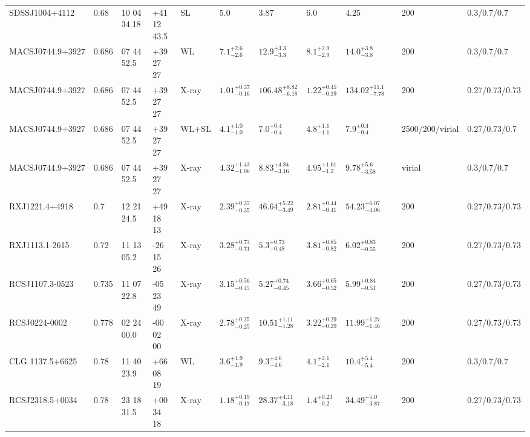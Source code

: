 \begin{landscape}
\begin{center}
{\begin{longtable}{llllllllllll}
SDSSJ1004+4112 & 0.68 & 10 04 34.18 & +41 12 43.5 & SL & ${5.0}^{}_{}$ & ${3.87}^{}_{}$ & ${6.0}^{}_{}$ & ${4.25}^{}_{}$ & \citet{WI04.1} & 200 & 0.3/0.7/0.7 \\
MACSJ0744.9+3927 & 0.686 & 07 44 52.5 & +39 27 27 & WL & ${7.1}^{+2.6}_{-2.6}$ & ${12.9}^{+3.3}_{-3.3}$ & ${8.1}^{+2.9}_{-2.9}$ & ${14.0}^{+3.8}_{-3.8}$ & \citet{SE14.1} & 200 & 0.3/0.7/0.7 \\
MACSJ0744.9+3927 & 0.686 & 07 44 52.5 & +39 27 27 & X-ray & ${1.01}^{+0.37}_{-0.16}$ & ${106.48}^{+8.82}_{-6.18}$ & ${1.22}^{+0.45}_{-0.19}$ & ${134.02}^{+11.1}_{-7.78}$ & \citet{BA14.1} & 200 & 0.27/0.73/0.73 \\
MACSJ0744.9+3927 & 0.686 & 07 44 52.5 & +39 27 27 & WL+SL & ${4.1}^{+1.0}_{-1.0}$ & ${7.0}^{+0.4}_{-0.4}$ & ${4.8}^{+1.1}_{-1.1}$ & ${7.9}^{+0.4}_{-0.4}$ & \citet{ME14.1} & 2500/200/virial & 0.27/0.73/0.7 \\
MACSJ0744.9+3927 & 0.686 & 07 44 52.5 & +39 27 27 & X-ray & ${4.32}^{+1.43}_{-1.06}$ & ${8.83}^{+4.84}_{-3.16}$ & ${4.95}^{+1.61}_{-1.2}$ & ${9.78}^{+5.6}_{-3.58}$ & \citet{SC07.1} & virial & 0.3/0.7/0.7 \\
RXJ1221.4+4918 & 0.7 & 12 21 24.5 & +49 18 13 & X-ray & ${2.39}^{+0.37}_{-0.35}$ & ${46.64}^{+5.22}_{-3.49}$ & ${2.81}^{+0.44}_{-0.41}$ & ${54.23}^{+6.07}_{-4.06}$ & \citet{BA14.1} & 200 & 0.27/0.73/0.73 \\
RXJ1113.1-2615 & 0.72 & 11 13 05.2 & -26 15 26 & X-ray & ${3.28}^{+0.73}_{-0.71}$ & ${5.3}^{+0.73}_{-0.48}$ & ${3.81}^{+0.85}_{-0.82}$ & ${6.02}^{+0.83}_{-0.55}$ & \citet{BA14.1} & 200 & 0.27/0.73/0.73 \\
RCSJ1107.3-0523 & 0.735 & 11 07 22.8 & -05 23 49 & X-ray & ${3.15}^{+0.56}_{-0.45}$ & ${5.27}^{+0.74}_{-0.45}$ & ${3.66}^{+0.65}_{-0.52}$ & ${5.99}^{+0.84}_{-0.51}$ & \citet{BA14.1} & 200 & 0.27/0.73/0.73 \\
RCSJ0224-0002 & 0.778 & 02 24 00.0 & -00 02 00 & X-ray & ${2.78}^{+0.25}_{-0.25}$ & ${10.51}^{+1.11}_{-1.28}$ & ${3.22}^{+0.29}_{-0.29}$ & ${11.99}^{+1.27}_{-1.46}$ & \citet{BA14.1} & 200 & 0.27/0.73/0.73 \\
CLG 1137.5+6625 & 0.78 & 11 40 23.9 & +66 08 19 & WL & ${3.6}^{+1.9}_{-1.9}$ & ${9.3}^{+4.6}_{-4.6}$ & ${4.1}^{+2.1}_{-2.1}$ & ${10.4}^{+5.4}_{-5.4}$ & \citet{SE14.1} & 200 & 0.3/0.7/0.7 \\
RCSJ2318.5+0034 & 0.78 & 23 18 31.5 & +00 34 18 & X-ray & ${1.18}^{+0.19}_{-0.17}$ & ${28.37}^{+4.11}_{-3.18}$ & ${1.4}^{+0.23}_{-0.2}$ & ${34.49}^{+5.0}_{-3.87}$ & \citet{BA14.1} & 200 & 0.27/0.73/0.73 \\

\end{longtable}}
\end{center}
\end{landscape}
